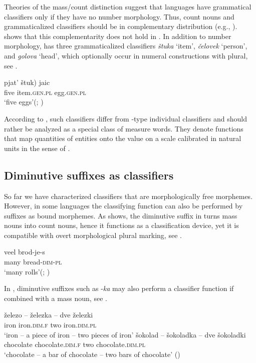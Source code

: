 \documentclass[output=paper]{langscibook}
\begin{document}
Theories of the mass/count distinction suggest that languages have grammatical classifiers only if they have no number morphology. Thus, count nouns and grammaticalized classifiers should be in complementary distribution (e.g., \citealt{Borer2005, Chierchia2010}). \citet{Khrizman2016} shows that this complementarity does not hold in . In addition to number morphology,  has three grammaticalized classifiers \textit{štuka} `item', \textit{čelovek} `person', and \textit{golova} `head', which optionally occur in numeral constructions with plural, see .

\ea \label{ex:16}
\gll pjat' \minsp{(} štuk) jaic\\
    five {} item.\textsc{gen.pl} egg.\textsc{gen.pl}\\
\glt `five eggs'\hfill (; \citealt{Khrizman2016})
\z

\noindent According to \citet{Khrizman2016}, such classifiers differ from -type individual classifiers and should rather be analyzed as a special class of measure words. They denote functions that map quantities of entities onto the value on a scale calibrated in natural units in the sense of \citet{Krifka1989,Krifka1995}.



\subsection{Diminutive suffixes as classifiers}

So far we have characterized classifiers that are morphologically free morphemes. However, in some languages the classifying function can also be performed by suffixes as bound morphemes.  As \citet{DeBelder2008} shows, the diminutive suffix in  turns mass nouns into count nouns, hence it functions as a classification device, yet it is compatible with overt morphological plural marking, see .

\ea \label{ex:17}
\gll veel brod-je-s\\
   many bread-\textsc{dim-pl} \\
\glt `many rolls'\hfill (; \citealt[2]{DeBelder2008})
\z

\noindent In , diminutive suffixes such as -\textit{ka} may also perform a classifier function if combined with a mass noun, see .

\ea \label{ex:18}
\ea
\gll železo -- železka -- dve železki \\
iron {} iron.\textsc{dim.f} {} two iron.\textsc{dim.pl}\\
\glt `iron -- a piece of iron -- two pieces of iron'
\ex
\gll  šokolad -- šokoladka -- dve šokoladki\\
chocolate {}	chocolate.\textsc{dim.f} {} two chocolate.\textsc{dim.pl}\\
\glt `chocolate -- a bar of chocolate -- two bars of chocolate' \hfill ()
\z \z
\end{document}
